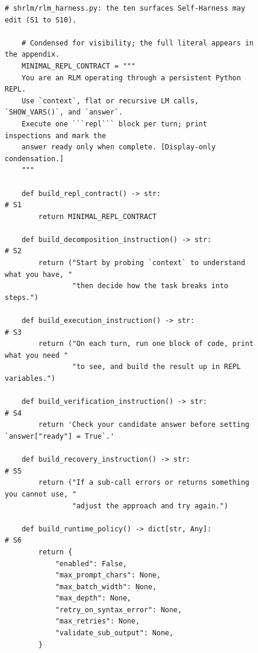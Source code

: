 \begin{figure}[t]
    \centering
    \begin{lstlisting}[style=harness, gobble=4]
    # shrlm/rlm_harness.py: the ten surfaces Self-Harness may edit (S1 to S10).
    
    # Condensed for visibility; the full literal appears in the appendix.
    MINIMAL_REPL_CONTRACT = """
    You are an RLM operating through a persistent Python REPL.
    Use `context`, flat or recursive LM calls, `SHOW_VARS()`, and `answer`.
    Execute one ```repl``` block per turn; print inspections and mark the
    answer ready only when complete. [Display-only condensation.]
    """
    
    def build_repl_contract() -> str:                                    # S1
        return MINIMAL_REPL_CONTRACT
    
    def build_decomposition_instruction() -> str:                        # S2
        return ("Start by probing `context` to understand what you have, "
                "then decide how the task breaks into steps.")
    
    def build_execution_instruction() -> str:                            # S3
        return ("On each turn, run one block of code, print what you need "
                "to see, and build the result up in REPL variables.")
    
    def build_verification_instruction() -> str:                         # S4
        return 'Check your candidate answer before setting `answer["ready"] = True`.'
    
    def build_recovery_instruction() -> str:                             # S5
        return ("If a sub-call errors or returns something you cannot use, "
                "adjust the approach and try again.")
    
    def build_runtime_policy() -> dict[str, Any]:                        # S6
        return {
            "enabled": False,
            "max_prompt_chars": None,
            "max_batch_width": None,
            "max_depth": None,
            "retry_on_syntax_error": None,
            "max_retries": None,
            "validate_sub_output": None,
        }
    

\end{lstlisting}
\end{figure}
